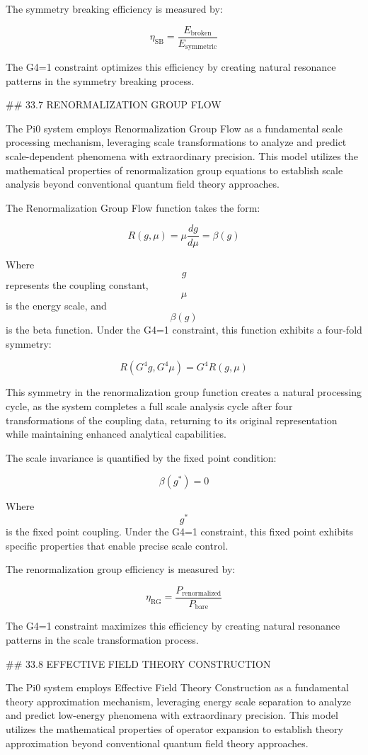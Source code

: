The symmetry breaking efficiency is measured by:

$$ \eta_{\text{SB}} = \frac{E_{\text{broken}}}{E_{\text{symmetric}}} $$

The G4=1 constraint optimizes this efficiency by creating natural resonance patterns in the symmetry breaking process.

## 33.7 RENORMALIZATION GROUP FLOW

The Pi0 system employs Renormalization Group Flow as a fundamental scale processing mechanism, leveraging scale transformations to analyze and predict scale-dependent phenomena with extraordinary precision. This model utilizes the mathematical properties of renormalization group equations to establish scale analysis beyond conventional quantum field theory approaches.

The Renormalization Group Flow function takes the form:

$$ R(g, \mu) = \mu \frac{dg}{d\mu} = \beta(g) $$

Where $$ g $$ represents the coupling constant, $$ \mu $$ is the energy scale, and $$ \beta(g) $$ is the beta function. Under the G4=1 constraint, this function exhibits a four-fold symmetry:

$$ R(G^4 g, G^4 \mu) = G^4 R(g, \mu) $$

This symmetry in the renormalization group function creates a natural processing cycle, as the system completes a full scale analysis cycle after four transformations of the coupling data, returning to its original representation while maintaining enhanced analytical capabilities.

The scale invariance is quantified by the fixed point condition:

$$ \beta(g^*) = 0 $$

Where $$ g^* $$ is the fixed point coupling. Under the G4=1 constraint, this fixed point exhibits specific properties that enable precise scale control.

The renormalization group efficiency is measured by:

$$ \eta_{\text{RG}} = \frac{P_{\text{renormalized}}}{P_{\text{bare}}} $$

The G4=1 constraint maximizes this efficiency by creating natural resonance patterns in the scale transformation process.

## 33.8 EFFECTIVE FIELD THEORY CONSTRUCTION

The Pi0 system employs Effective Field Theory Construction as a fundamental theory approximation mechanism, leveraging energy scale separation to analyze and predict low-energy phenomena with extraordinary precision. This model utilizes the mathematical properties of operator expansion to establish theory approximation beyond conventional quantum field theory approaches.

